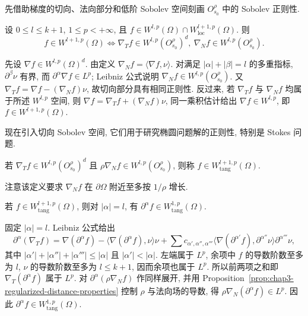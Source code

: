 先借助梯度的切向、法向部分和低阶 Sobolev 空间刻画 $O_{s_0}^\rho$ 中的 Sobolev 正则性.

\begin{Theorem}
\label{thm:chap3-tangential-normal-regularity}
设 $0\leq l\leq k+1$, $1\leq p<+\infty$, 且 $f\in W^{l,p}(\Omega)\cap W_{\mathrm{loc}}^{l+1,p}(\Omega)$. 则
\[
 f\in W^{l+1,p}(\Omega)
 \Longleftrightarrow
 \nabla_Tf\in W^{l,p}(O_{s_0}^\rho)^d,
 \ \nabla_Nf\in W^{l,p}(O_{s_0}^\rho).
\]
\end{Theorem}

\begin{Proof}
先设 $\nabla f\in W^{l,p}(\Omega)^d$. 由定义 $\nabla_Nf=\langle\nabla f,\nu\rangle$. 对满足 $|\alpha|+|\beta|=l$ 的多重指标, $\partial^\beta\nu$ 有界, 而 $\partial^\alpha\nabla f\in L^p$; Leibniz 公式说明 $\nabla_Nf\in W^{l,p}(O_{s_0}^\rho)$. 又 $\nabla_Tf=\nabla f-(\nabla_Nf)\nu$, 故切向部分具有相同正则性. 反过来, 若 $\nabla_Tf$ 与 $\nabla_Nf$ 均属于所述 $W^{l,p}$ 空间, 则 $\nabla f=\nabla_Tf+(\nabla_Nf)\nu$, 同一乘积估计给出 $\nabla f\in W^{l,p}$, 即 $f\in W^{l+1,p}(\Omega)$.
\end{Proof}

现在引入切向 Sobolev 空间, 它们用于研究椭圆问题解的正则性, 特别是 Stokes 问题.

\begin{Definition}
\label{def:chap3-weighted-tangential-sobolev}
若 $\nabla_Tf\in W^{l,p}(O_{s_0}^\rho)^d$ 且 $\rho\nabla_Nf\in W^{l,p}(O_{s_0}^\rho)$, 则称 $f\in W_{\mathrm{tang}}^{l+1,p}(\Omega)$.
\end{Definition}

注意该定义要求 $\nabla_Nf$ 在 $\partial\Omega$ 附近至多按 $1/\rho$ 增长.

\begin{Proposition}
\label{prop:chap3-tangential-derivatives-stability}
若 $f\in W_{\mathrm{tang}}^{l+1,p}(\Omega)$, 则对 $|\alpha|=l$, 有 $\partial^\alpha f\in W_{\mathrm{tang}}^{1,p}(\Omega)$.
\end{Proposition}

\begin{Proof}
固定 $|\alpha|=l$. Leibniz 公式给出
\[
 \partial^\alpha(\nabla_Tf)
 =\nabla(\partial^\alpha f)-
 \langle\nabla(\partial^\alpha f),\nu\rangle\nu
 +\sum c_{\alpha',\alpha'',\alpha'''}
 \langle\nabla(\partial^{\alpha'}f),\partial^{\alpha''}\nu\rangle
 \partial^{\alpha'''}\nu,
\]
其中 $|\alpha'|+|\alpha''|+|\alpha'''|\leq|\alpha|$ 且 $|\alpha'|<|\alpha|$. 左端属于 $L^p$, 余项中 $f$ 的导数阶数至多为 $l$, $\nu$ 的导数阶数至多为 $l\leq k+1$, 因而余项也属于 $L^p$. 所以前两项之和即 $\nabla_T(\partial^\alpha f)$ 属于 $L^p$. 对 $\partial^\alpha(\rho\nabla_Nf)$ 作同样展开, 并用 Proposition~\ref{prop:chap3-regularized-distance-properties} 控制 $\rho$ 与法向场的导数, 得 $\rho\nabla_N(\partial^\alpha f)\in L^p$. 因此 $\partial^\alpha f\in W_{\mathrm{tang}}^{1,p}(\Omega)$.
\end{Proof}

